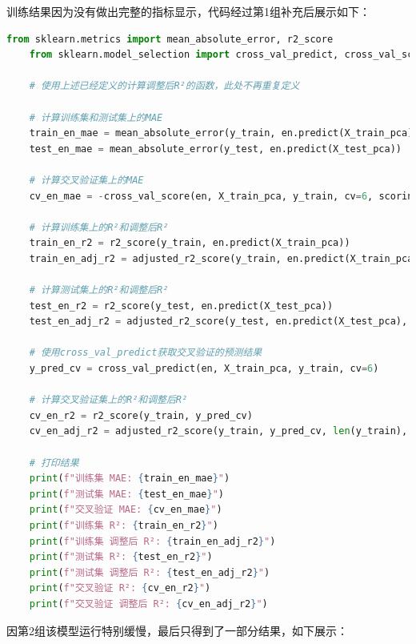 \documentclass[
    report,     %
    oneside,    %
    UTF8,       %
    zihao=-4    %
]{config} %
\begin{document}
训练结果因为没有做出完整的指标显示，代码经过第1组补充后展示如下：
\begin{lstlisting}[label=code:elasticnet_R^2, language=Python, caption=ElasticNet模型样本内外和交叉验证的MAE、$R^2$、$Adj. R^2$计算]
    from sklearn.metrics import mean_absolute_error, r2_score
    from sklearn.model_selection import cross_val_predict, cross_val_score
    
    # 使用上述已经定义的计算调整后R²的函数，此处不再重复定义
    
    # 计算训练集和测试集上的MAE
    train_en_mae = mean_absolute_error(y_train, en.predict(X_train_pca))
    test_en_mae = mean_absolute_error(y_test, en.predict(X_test_pca))
    
    # 计算交叉验证集上的MAE
    cv_en_mae = -cross_val_score(en, X_train_pca, y_train, cv=6, scoring='neg_mean_absolute_error').mean()
    
    # 计算训练集上的R²和调整后R²
    train_en_r2 = r2_score(y_train, en.predict(X_train_pca))
    train_en_adj_r2 = adjusted_r2_score(y_train, en.predict(X_train_pca), len(y_train), X_train_pca.shape[1])
    
    # 计算测试集上的R²和调整后R²
    test_en_r2 = r2_score(y_test, en.predict(X_test_pca))
    test_en_adj_r2 = adjusted_r2_score(y_test, en.predict(X_test_pca), len(y_test), X_test_pca.shape[1])
    
    # 使用cross_val_predict获取交叉验证的预测结果
    y_pred_cv = cross_val_predict(en, X_train_pca, y_train, cv=6)
    
    # 计算交叉验证集上的R²和调整后R²
    cv_en_r2 = r2_score(y_train, y_pred_cv)
    cv_en_adj_r2 = adjusted_r2_score(y_train, y_pred_cv, len(y_train), X_train_pca.shape[1])
    
    # 打印结果
    print(f"训练集 MAE: {train_en_mae}")
    print(f"测试集 MAE: {test_en_mae}")
    print(f"交叉验证 MAE: {cv_en_mae}")
    print(f"训练集 R²: {train_en_r2}")
    print(f"训练集 调整后 R²: {train_en_adj_r2}")
    print(f"测试集 R²: {test_en_r2}")
    print(f"测试集 调整后 R²: {test_en_adj_r2}")
    print(f"交叉验证 R²: {cv_en_r2}")
    print(f"交叉验证 调整后 R²: {cv_en_adj_r2}")
\end{lstlisting}

因第2组该模型运行特别缓慢，最后只得到了一部分结果，如下展示：

\begin{table}[htbp]
    \centering
    \caption{ElasticNet模型在样本内、样本外及交叉验证时的MAE表现}
    \label{tab:elasticnet_mae_r2}
\end{table}
\end{document}
